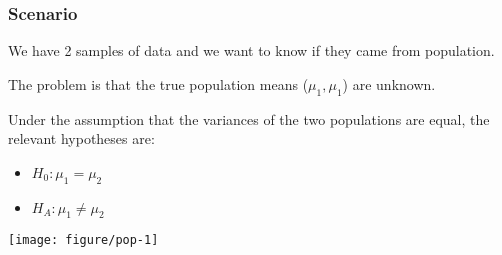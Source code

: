 \documentclass[color=usenames,dvipsnames]{beamer}\usepackage[]{graphicx}\usepackage[]{color}
\makeatletter
\def\maxwidth{ %
  \ifdim\Gin@nat@width>\linewidth
    \linewidth
  \else
    \Gin@nat@width
  \fi
}
\newenvironment{knitrout}{}{} %
\makeatother
\begin{document}
\begin{frame}[fragile]
  \frametitle{Scenario}
  \small
  We have 2 samples of data and we want to know if they came from
  population. \\
  \pause
  \vfill

  The problem is that the true population means ($\mu_1, \mu_1$) are
  unknown. \\ %
  \pause
  \vfill

Under the assumption that the variances of the two populations are
equal, the relevant hypotheses are:
\begin{itemize}
  \footnotesize
  \item $H_0: \mu_1 = \mu_2$
  \item $H_A: \mu_1 \neq \mu_2$
\end{itemize}
  \normalsize
  \pause
  \vfill
\begin{knitrout}
\color{fgcolor}
\texttt{[image: figure/pop-1]} 

\end{knitrout}
\end{frame}
\end{document}
